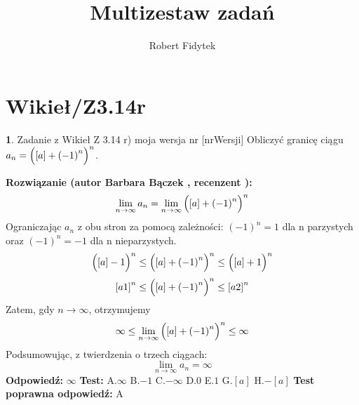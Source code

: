 \documentclass[12pt, a4paper]{article}
\title{Multizestaw zadań}
\author{Robert Fidytek}
\date{}
\theoremstyle{definition} %
\newtheorem{zad}{}
\newcommand{\kategoria}[1]{\section{#1}} %
\newcommand{\zadStart}[1]{\begin{zad}#1\newline} %
\newcommand{\zadStop}{\end{zad}}   %
\newcommand{\rozwStart}[2]{\noindent \textbf{Rozwiązanie (autor #1 , recenzent #2): }\newline} %
\newcommand{\rozwStop}{\newline}                                            %
\newcommand{\odpStart}{\noindent \textbf{Odpowiedź:}\newline}    %
\newcommand{\odpStop}{\newline}                                             %
\newcommand{\testStart}{\noindent \textbf{Test:}\newline} %
\newcommand{\testStop}{\newline} %
\newcommand{\kluczStart}{\noindent \textbf{Test poprawna odpowiedź:}\newline} %
\newcommand{\kluczStop}{\newline} %
\begin{document}
\maketitle


\kategoria{Wikieł/Z3.14r}
\zadStart{Zadanie z Wikieł Z 3.14 r) moja wersja nr [nrWersji]}
Obliczyć granicę ciągu $a_n= {\Big{(} [a]+ {(-1)}^n \Big{)} }^n$.
\zadStop
\rozwStart{Barbara Bączek}{}
$$\lim_{n \rightarrow \infty} a_n= \lim_{n \rightarrow \infty} {\Big{(} [a]+ {(-1)}^n \Big{)} }^n$$
Ograniczając $a_n$ z obu stron za pomocą zależności: ${(-1)}^n = 1$ dla n parzystych oraz ${(-1)}^n = -1$ dla n nieparzystych.
$${\Big{(} [a] -1 \Big{)} }^n \leq {\Big{(} [a]+ {(-1)}^n \Big{)} }^n \leq {\Big{(} [a]+ 1 \Big{)} }^n$$
$${ [a1] }^n \leq {\Big{(} [a]+ {(-1)}^n \Big{)} }^n \leq { [a2] }^n$$
Zatem, gdy $n \rightarrow \infty$, otrzymujemy
$$\infty \leq  \lim_{n \rightarrow \infty}  {\Big{(} [a]+ {(-1)}^n \Big{)} }^n  \leq \infty $$
Podsumowując, z twierdzenia o trzech ciągach:  $$\lim_{n \rightarrow \infty} a_n= \infty $$
\rozwStop
\odpStart
$\infty$
\odpStop
\testStart
A.$\infty$
B.$-1$
C.$-\infty$
D.$0$
E.$1$
G.$[a]$
H.$-[a]$
\testStop
\kluczStart
A
\kluczStop
\end{document}
